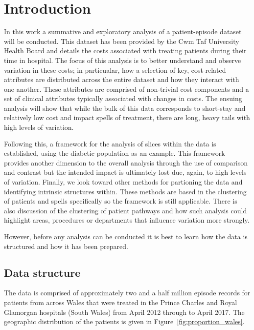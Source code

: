 \section{Introduction}\label{sec:intro}

In this work a summative and exploratory analysis of a patient-episode dataset
will be conducted. This dataset has been provided by the Cwm Taf University
Health Board and details the costs associated with treating patients during
their time in hospital. The focus of this analysis is to better understand and
observe variation in these costs; in particualar, how a selection of key,
cost-related attributes are distributed across the entire dataset and how
they interact with one another. These attributes are comprised of non-trivial
cost components and a set of clinical attributes typically associated with
changes in costs. The ensuing analysis will show that while the bulk of this data
corresponds to short-stay and relatively low cost and impact spells of
treatment, there are long, heavy tails with high levels of variation.
        
Following this, a framework for the analysis of slices within the data is
established, using the diabetic population as an example. This framework
provides another dimension to the overall analysis through the use of comparison
and contrast but the intended impact is ultimately lost due, again, to high
levels of variation. Finally, we look toward other methods
for partioning the data and identifying intrinsic structures within. These
methods are based in the clustering of patients and spells specifically so the
framework is still applicable. There is also discussion of the clustering of
patient pathways and how such analysis could highlight areas, procedures or
departments that influence variation more strongly.

However, before any analysis can be conducted it is best to learn how the data
is structured and how it has been prepared.

\subsection{Data structure}\label{subsec:structure}

The data is comprised of approximately two and a half million episode
records for patients from across Wales that were treated in the Prince
Charles and Royal Glamorgan hospitals (South Wales) from April 2012 through to
April 2017. The geographic distribution of the patients is given in
Figure~\ref{fig:proportion_wales}.

